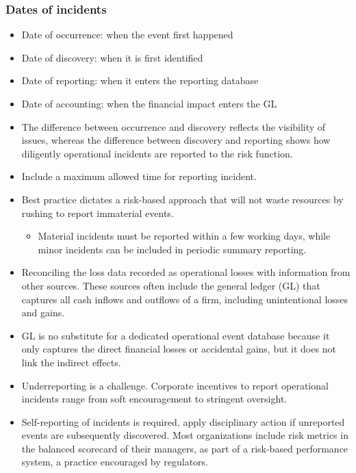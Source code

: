 \subsubsection{Dates of incidents}
\begin{itemize}
\item Date of occurrence: when the event first happened
\item  Date of discovery: when it is first identified
\item  Date of reporting: when it enters the reporting database
\item  Date of accounting: when the financial impact enters the GL
\item  The difference between occurrence and discovery reflects the visibility of issues, whereas the difference between discovery and reporting shows how diligently operational incidents are reported to the risk function.
\item Include a maximum allowed time for reporting incident.
\item  Best practice dictates a risk-based approach that will not waste resources by rushing to report immaterial events.
    \begin{itemize}
    \item Material incidents must be reported within a few working days, while minor incidents can be included in periodic summary reporting.
    \end{itemize}

\item Reconciling the loss data recorded as operational losses with information from other sources. These sources often include the general ledger (GL) that captures all cash inflows and outflows of a firm, including unintentional losses and gains.
\item  GL is no substitute for a dedicated operational event database because it only captures the direct financial losses or accidental gains, but it does not link the indirect effects.
\item Underreporting is a challenge. Corporate incentives to report operational incidents range from soft encouragement to stringent oversight.
\item  Self-reporting of incidents is required, apply disciplinary action if unreported events are subsequently discovered. Most organizations include risk metrics in the balanced scorecard of their managers, as part of a risk-based performance system, a practice encouraged by regulators.



\end{itemize}


